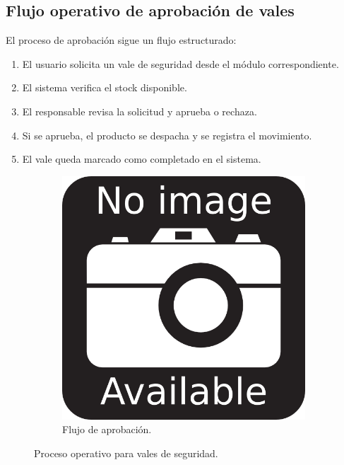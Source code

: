 \subsection{Flujo operativo de aprobación de vales}

El proceso de aprobación sigue un flujo estructurado:

\begin{enumerate}
    \item El usuario solicita un vale de seguridad desde el módulo correspondiente.
    \item El sistema verifica el stock disponible.
    \item El responsable revisa la solicitud y aprueba o rechaza.
    \item Si se aprueba, el producto se despacha y se registra el movimiento.
    \item El vale queda marcado como completado en el sistema.
\end{enumerate}

\begin{figure}[h]
\centering
\begin{subfigure}{0.4\textwidth}
    \includegraphics[width=\textwidth]{imgs/no-image.png}
    \caption{Flujo de aprobación.}
    \label{fig:epp3}
\end{subfigure}
\caption{Proceso operativo para vales de seguridad.}
\end{figure}